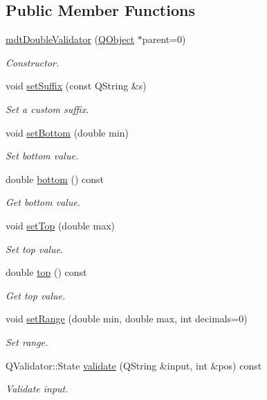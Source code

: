 \subsection*{Public Member Functions}
\begin{DoxyCompactItemize}
\item 
\hyperlink{classmdt_double_validator_a4b1ee52feff69d9809caa47dfdda43f6}{mdt\-Double\-Validator} (\hyperlink{class_q_object}{Q\-Object} $\ast$parent=0)
\begin{DoxyCompactList}\small\item\em Constructor. \end{DoxyCompactList}\item 
void \hyperlink{classmdt_double_validator_a9741c74656a66eb9376e230c67d1e39a}{set\-Suffix} (const Q\-String \&s)
\begin{DoxyCompactList}\small\item\em Set a custom suffix. \end{DoxyCompactList}\item 
void \hyperlink{classmdt_double_validator_a9cd93164abc582ef7ffe7a856e52cd9f}{set\-Bottom} (double min)
\begin{DoxyCompactList}\small\item\em Set bottom value. \end{DoxyCompactList}\item 
double \hyperlink{classmdt_double_validator_a4dd214c184264cbe0a7507982d843ca5}{bottom} () const 
\begin{DoxyCompactList}\small\item\em Get bottom value. \end{DoxyCompactList}\item 
void \hyperlink{classmdt_double_validator_ac063ca06299ee123cb05bfb6d64d78cf}{set\-Top} (double max)
\begin{DoxyCompactList}\small\item\em Set top value. \end{DoxyCompactList}\item 
double \hyperlink{classmdt_double_validator_a038ad17fe42138b70f91ba34dafdda09}{top} () const 
\begin{DoxyCompactList}\small\item\em Get top value. \end{DoxyCompactList}\item 
void \hyperlink{classmdt_double_validator_ac8f9282902ae5a54bba7e8feb262ae3f}{set\-Range} (double min, double max, int decimals=0)
\begin{DoxyCompactList}\small\item\em Set range. \end{DoxyCompactList}\item 
Q\-Validator\-::\-State \hyperlink{classmdt_double_validator_a45b3133233d99ef2a46028eda87bad4b}{validate} (Q\-String \&input, int \&pos) const 
\begin{DoxyCompactList}\small\item\em Validate input. \end{DoxyCompactList}\end{DoxyCompactItemize}



